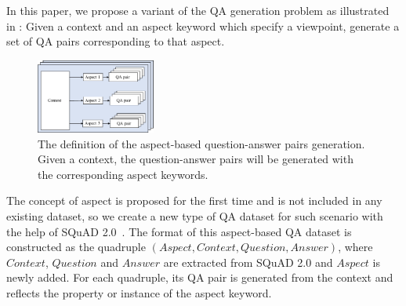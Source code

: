 In this paper, we propose a variant of the QA generation problem as
illustrated in :
Given a context and an aspect keyword which specify a viewpoint, 
generate a set of QA pairs corresponding to that aspect.
\begin{figure}[th]
    \centering
    \includegraphics[width=0.35\textwidth]{pic/process.pdf}
    \caption{\label{fig:process} The definition of the aspect-based 
question-answer pairs generation. 
Given a context, the question-answer pairs will be generated 
with the corresponding aspect keywords. 
} 
\end{figure}
The concept of aspect is proposed for the first time and is not included in any existing dataset, 
so we create a new type of QA dataset for such scenario with the help of SQuAD 2.0~\cite{rajpurkar2018know}. 
The format of this aspect-based QA dataset is constructed as the quadruple $(Aspect, Context, Question, Answer)$, where $Context$, $Question$ and $Answer$ are extracted from SQuAD 2.0 and $Aspect$ is newly added.
For each quadruple, its QA pair is generated from the context and reflects the property or instance of the aspect keyword.




